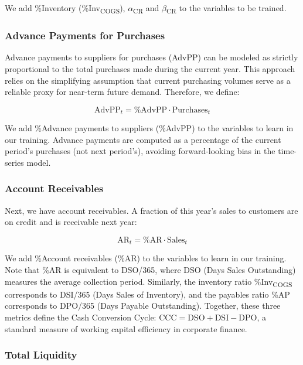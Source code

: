 \documentclass[12pt,a4paper]{article}
\begin{document}
We add \%Inventory (\%Inv\textsubscript{COGS}), $\alpha$\textsubscript{CR} and $\beta$\textsubscript{CR}
to the variables to be trained.

\subsubsection{Advance Payments for Purchases}

Advance payments to suppliers for purchases (AdvPP) can be modeled as
strictly proportional to the total purchases made during the current
year. This approach relies on the simplifying assumption that current
purchasing volumes serve as a reliable proxy for near-term future
demand. Therefore, we define:

\begin{equation}\label{eq:advpp}
\text{AdvPP}_t = \text{\%AdvPP} \cdot \text{Purchases}_t
\end{equation}

We add \%Advance payments to suppliers (\%AdvPP) to the variables to
learn in our training. Advance payments are computed as a percentage of the current period's purchases (not next period's), avoiding forward-looking bias in the time-series model.

\subsubsection{Account Receivables}

Next, we have account receivables. A fraction of this year's sales to
customers are on credit and is receivable next year:

\begin{equation}\label{eq:account_receivables}
\text{AR}_t = \text{\%AR} \cdot \text{Sales}_t
\end{equation}

We add \%Account receivables (\%AR) to the variables to learn in our
training. Note that \%AR is equivalent to DSO/365, where DSO (Days Sales Outstanding) measures the average collection period. Similarly, the inventory ratio \%Inv\textsubscript{COGS} corresponds to DSI/365 (Days Sales of Inventory), and the payables ratio \%AP corresponds to DPO/365 (Days Payable Outstanding). Together, these three metrics define the Cash Conversion Cycle: $\text{CCC} = \text{DSO} + \text{DSI} - \text{DPO}$, a standard measure of working capital efficiency in corporate finance.

\subsubsection{Total Liquidity}
\label{sec:total_liquidity_policy}
\end{document}
